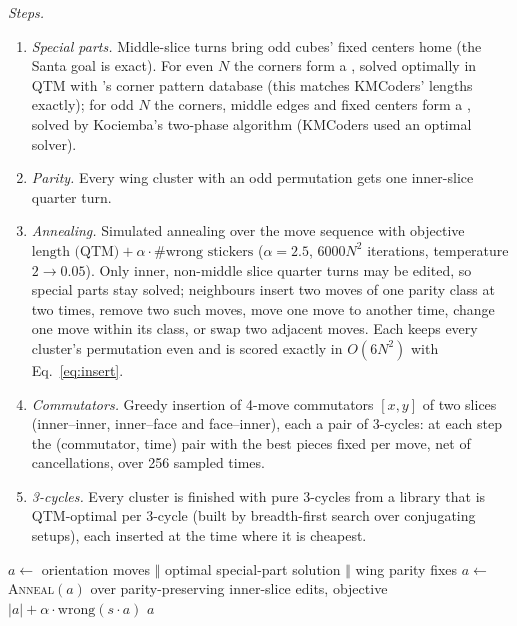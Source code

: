\emph{Steps.}
\begin{enumerate}
\item \emph{Special parts.} Middle-slice turns bring odd cubes' fixed centers home (the Santa goal is exact). For even $N$
  the corners form a , solved optimally in QTM with \Mone's corner pattern database (this matches KMCoders' 
  lengths exactly); for odd $N$ the corners, middle edges and fixed centers form a , solved by Kociemba's two-phase
  algorithm (KMCoders used an optimal solver).
\item \emph{Parity.} Every wing cluster with an odd permutation gets one inner-slice quarter turn.
\item \emph{Annealing.} Simulated annealing over the move sequence with objective
  $\text{length (QTM)}+\alpha\cdot\#\text{wrong stickers}$ ($\alpha=2.5$, $6000N^2$ iterations, temperature $2\to0.05$).
  Only inner, non-middle slice quarter turns may be edited, so special parts stay solved; neighbours insert two moves of
  one parity class at two times, remove two such moves, move one move to another time, change one move within its class,
  or swap two adjacent moves. Each keeps every cluster's permutation even and is scored exactly in $O(6N^2)$ with
  Eq.~\eqref{eq:insert}.
\item \emph{Commutators.} Greedy insertion of 4-move commutators $[x,y]$ of two slices (inner--inner, inner--face and
  face--inner), each a pair of 3-cycles: at each step the (commutator, time) pair with the best pieces fixed per move, net of
  cancellations, over 256 sampled times.
\item \emph{3-cycles.} Every cluster is finished with pure 3-cycles from a library that is QTM-optimal per 3-cycle (built
  by breadth-first search over conjugating setups), each inserted at the time where it is cheapest.
\end{enumerate}

\begin{algorithm}[t]
\caption{\Msix: KMCoders pipeline (our reproduction from the write-up)}
\label{alg:m6}
\small
{}
$a\leftarrow$ orientation moves $\Vert$ optimal special-part solution $\Vert$ wing parity fixes\;
$a\leftarrow$ \textsc{Anneal}$(a)$ over parity-preserving inner-slice edits, objective $|a|+\alpha\cdot\mathrm{wrong}(s\cdot a)$\;
\Return $a$\;
\end{algorithm}

